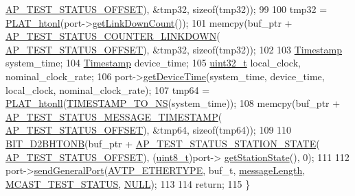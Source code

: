 \begin{DoxyCode}
      \hyperlink{avbap__message_8hpp_a098685900cab07ec2886722ea6b6b85e}{AP\_TEST\_STATUS\_OFFSET}), &tmp32, \textcolor{keyword}{sizeof}(tmp32));
99 
100     tmp32 = \hyperlink{linux_2src_2platform_8cpp_a8bf9e45ac3e41441f0e139139241c19d}{PLAT\_htonl}(port->\hyperlink{class_ether_port_a2b17baca9933f02f9e3bd25983395d97}{getLinkDownCount}());
101     memcpy(buf\_ptr + \hyperlink{avbap__message_8hpp_a270da675ee7eaecd6ff2d16c7c002652}{AP\_TEST\_STATUS\_COUNTER\_LINKDOWN}(
      \hyperlink{avbap__message_8hpp_a098685900cab07ec2886722ea6b6b85e}{AP\_TEST\_STATUS\_OFFSET}), &tmp32, \textcolor{keyword}{sizeof}(tmp32));
102 
103     \hyperlink{class_timestamp}{Timestamp} system\_time;
104     \hyperlink{class_timestamp}{Timestamp} device\_time;
105     \hyperlink{parse_8c_a6eb1e68cc391dd753bc8ce896dbb8315}{uint32\_t} local\_clock, nominal\_clock\_rate;
106     port->\hyperlink{class_common_port_a16ab03ee31d5e246f05098d1e89f2537}{getDeviceTime}(system\_time, device\_time, local\_clock, nominal\_clock\_rate);
107     tmp64 = \hyperlink{linux_2src_2platform_8cpp_af650711ffc00c79514542fa37c393871}{PLAT\_htonll}(\hyperlink{ieee1588_8hpp_a0f6cecd8adce4a7314f084f3ead49999}{TIMESTAMP\_TO\_NS}(system\_time));
108     memcpy(buf\_ptr + \hyperlink{avbap__message_8hpp_ad1887f34f0cbd1c2651574afc18b4909}{AP\_TEST\_STATUS\_MESSAGE\_TIMESTAMP}(
      \hyperlink{avbap__message_8hpp_a098685900cab07ec2886722ea6b6b85e}{AP\_TEST\_STATUS\_OFFSET}), &tmp64, \textcolor{keyword}{sizeof}(tmp64));
109 
110     \hyperlink{ap__message_8cpp_a96729df4f440a649d696b081c6dfac8b}{BIT\_D2BHTONB}(buf\_ptr + \hyperlink{avbap__message_8hpp_ac920c9947ca8634388ab81981cbec1d6}{AP\_TEST\_STATUS\_STATION\_STATE}(
      \hyperlink{avbap__message_8hpp_a098685900cab07ec2886722ea6b6b85e}{AP\_TEST\_STATUS\_OFFSET}), (\hyperlink{stdint_8h_aba7bc1797add20fe3efdf37ced1182c5}{uint8\_t})port->
      \hyperlink{class_ether_port_ace2ea6ac1044661ce0c3b2fe41c17b67}{getStationState}(), 0);
111 
112     port->\hyperlink{class_ether_port_a9de15e5c639faaf04407f126e241358a}{sendGeneralPort}(\hyperlink{ptptypes_8hpp_a5b1bf68188cd446804517837363ac277}{AVTP\_ETHERTYPE}, buf\_t, 
      \hyperlink{class_a_p_message_test_status_a6c490faee54bca860c4d897aae50990f}{messageLength}, \hyperlink{avbts__message_8hpp_aee4ca524cb617678ed1bd2db2b56da42a3cf3ca871c9f67772b8de624f4a7f333}{MCAST\_TEST\_STATUS}, \hyperlink{openavb__types__base__pub_8h_a070d2ce7b6bb7e5c05602aa8c308d0c4}{NULL});
113 
114     \textcolor{keywordflow}{return};
115 \}
\end{DoxyCode}


